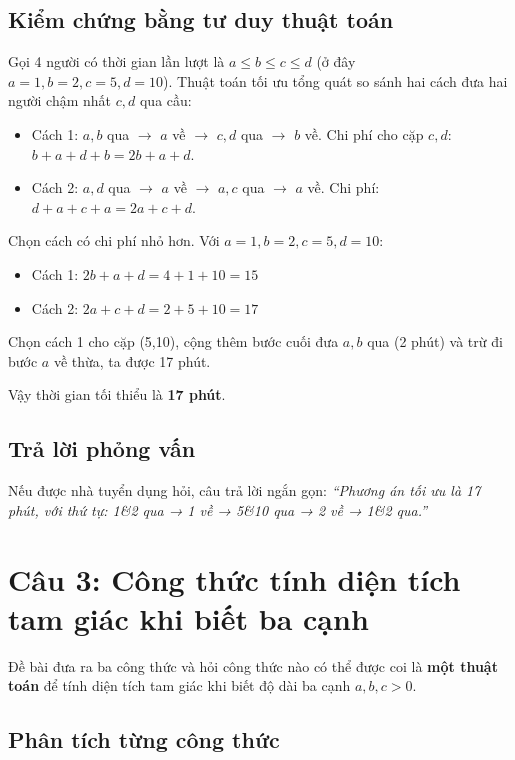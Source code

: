 \documentclass[12pt,a4paper]{article}
\begin{document}
\subsection*{Kiểm chứng bằng tư duy thuật toán}
Gọi 4 người có thời gian lần lượt là $a \le b \le c \le d$ (ở đây $a=1, b=2, c=5, d=10$). Thuật toán tối ưu tổng quát so sánh hai cách đưa hai người chậm nhất $c, d$ qua cầu:
\begin{itemize}
    \item Cách 1: $a, b$ qua $\rightarrow$ $a$ về $\rightarrow$ $c, d$ qua $\rightarrow$ $b$ về. Chi phí cho cặp $c,d$: $b + a + d + b = 2b + a + d$.
    \item Cách 2: $a, d$ qua $\rightarrow$ $a$ về $\rightarrow$ $a, c$ qua $\rightarrow$ $a$ về. Chi phí: $d + a + c + a = 2a + c + d$.
\end{itemize}
Chọn cách có chi phí nhỏ hơn. Với $a=1, b=2, c=5, d=10$:
\begin{itemize}
    \item Cách 1: $2b + a + d = 4 + 1 + 10 = 15$
    \item Cách 2: $2a + c + d = 2 + 5 + 10 = 17$
\end{itemize}
Chọn cách 1 cho cặp (5,10), cộng thêm bước cuối đưa $a, b$ qua (2 phút) và trừ đi bước $a$ về thừa, ta được 17 phút.

Vậy thời gian tối thiểu là \textbf{17 phút}.

\subsection*{Trả lời phỏng vấn}
Nếu được nhà tuyển dụng hỏi, câu trả lời ngắn gọn: \textit{“Phương án tối ưu là 17 phút, với thứ tự: 1\&2 qua → 1 về → 5\&10 qua → 2 về → 1\&2 qua.”}

\section*{Câu 3: Công thức tính diện tích tam giác khi biết ba cạnh}

Đề bài đưa ra ba công thức và hỏi công thức nào có thể được coi là \textbf{một thuật toán} để tính diện tích tam giác khi biết độ dài ba cạnh $a,b,c>0$.

\subsection*{Phân tích từng công thức}
\end{document}
